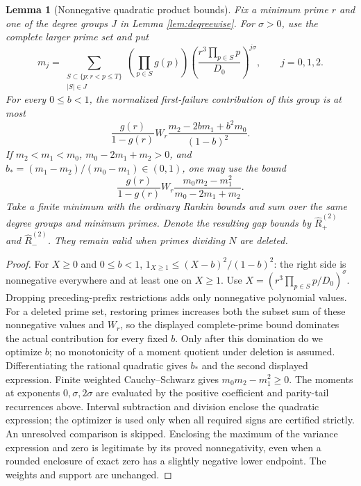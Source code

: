 \documentclass[11pt]{article}
\newtheorem{lemma}[theorem]{Lemma}
\begin{document}
\begin{lemma}[Nonnegative quadratic product bounds]\label{lem:quadratic}
Fix a minimum prime $r$ and one of the degree groups $J$ in
Lemma \ref{lem:degreewise}. For $\sigma>0$, use the complete larger
prime set and put
\[
m_j=\sum_{\substack{S\subset\{p:r<p\le T\}\\ |S|\in J}}
 \left(\prod_{p\in S}g(p)\right)
 \left(\frac{r^3\prod_{p\in S}p}{D_0}\right)^{j\sigma},
 \qquad j=0,1,2.
\]
For every $0\le b<1$, the normalized first-failure contribution
of this group is at most
\[
\frac{g(r)}{1-g(r)}W_r
 \frac{m_2-2bm_1+b^2m_0}{(1-b)^2}.
\]
If $m_2<m_1<m_0$, $m_0-2m_1+m_2>0$, and
$b_*=(m_1-m_2)/(m_0-m_1)\in(0,1)$, one may use the bound
\[
\frac{g(r)}{1-g(r)}W_r
 \frac{m_0m_2-m_1^2}{m_0-2m_1+m_2}.
\]
Take a finite minimum with the ordinary Rankin bounds and sum
over the same degree groups and minimum primes. Denote the resulting
gap bounds by $\widehat R^{(2)}_+$ and $\widehat R^{(2)}_-$.
They remain valid when primes dividing $N$ are deleted.
\end{lemma}
\begin{proof}
For $X\ge0$ and $0\le b<1$,
$1_{X\ge1}\le (X-b)^2/(1-b)^2$: the right side is nonnegative
everywhere and at least one on $X\ge1$.
Use $X=(r^3\prod_{p\in S}p/D_0)^\sigma$.
Dropping preceding-prefix restrictions adds only nonnegative
polynomial values. For a deleted prime set, restoring primes
increases both the subset sum of these nonnegative values and $W_r$,
so the displayed complete-prime bound dominates the actual contribution
for every fixed $b$. Only after this domination do we optimize $b$;
no monotonicity of a moment quotient under deletion is assumed.
Differentiating the rational quadratic gives $b_*$ and the second
displayed expression. Finite weighted Cauchy--Schwarz gives
$m_0m_2-m_1^2\ge0$.
The moments at exponents $0,\sigma,2\sigma$ are evaluated by the
positive coefficient and parity-tail recurrences above.
Interval subtraction and division enclose the quadratic expression;
the optimizer is used only when all required signs are certified
strictly. An unresolved comparison is skipped. Enclosing the maximum
of the variance expression and zero is legitimate by its proved
nonnegativity, even when a rounded enclosure of exact zero has a
slightly negative lower endpoint. The weights and support are unchanged.
\end{proof}
\end{document}
